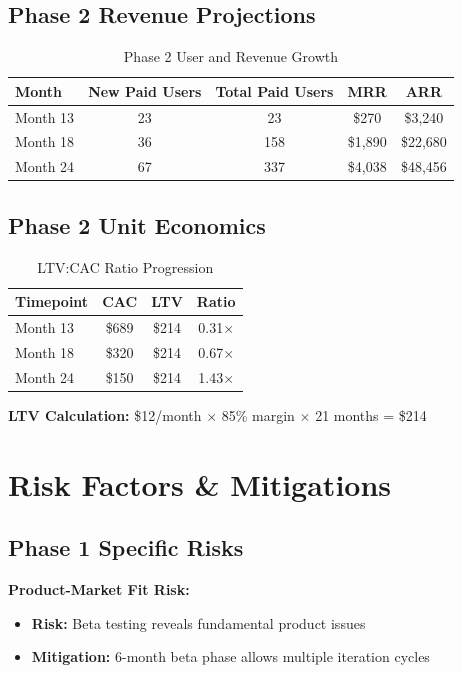 \documentclass[11pt,letterpaper]{article}
\begin{document}
\subsection{Phase 2 Revenue Projections}

\begin{table}[h]
\centering
\caption{Phase 2 User and Revenue Growth}
\begin{tabular}{|l|c|c|c|c|}
\hline
\textbf{Month} & \textbf{New Paid Users} & \textbf{Total Paid Users} & \textbf{MRR} & \textbf{ARR} \\
\hline
Month 13 & 23 & 23 & \$270 & \$3,240 \\
Month 18 & 36 & 158 & \$1,890 & \$22,680 \\
Month 24 & 67 & 337 & \$4,038 & \$48,456 \\
\hline
\end{tabular}
\end{table}

\subsection{Phase 2 Unit Economics}

\begin{table}[h]
\centering
\caption{LTV:CAC Ratio Progression}
\begin{tabular}{|l|c|c|c|}
\hline
\textbf{Timepoint} & \textbf{CAC} & \textbf{LTV} & \textbf{Ratio} \\
\hline
Month 13 & \$689 & \$214 & 0.31$\times$ \\
Month 18 & \$320 & \$214 & 0.67$\times$ \\
Month 24 & \$150 & \$214 & 1.43$\times$ \\
\hline
\end{tabular}
\end{table}

\textbf{LTV Calculation:} \$12/month $\times$ 85\% margin $\times$ 21 months = \$214

\newpage

\section{Risk Factors \& Mitigations}

\subsection{Phase 1 Specific Risks}

\textbf{Product-Market Fit Risk:}
\begin{itemize}
\item \textbf{Risk:} Beta testing reveals fundamental product issues
\item \textbf{Mitigation:} 6-month beta phase allows multiple iteration cycles
\end{itemize}
\end{document}
